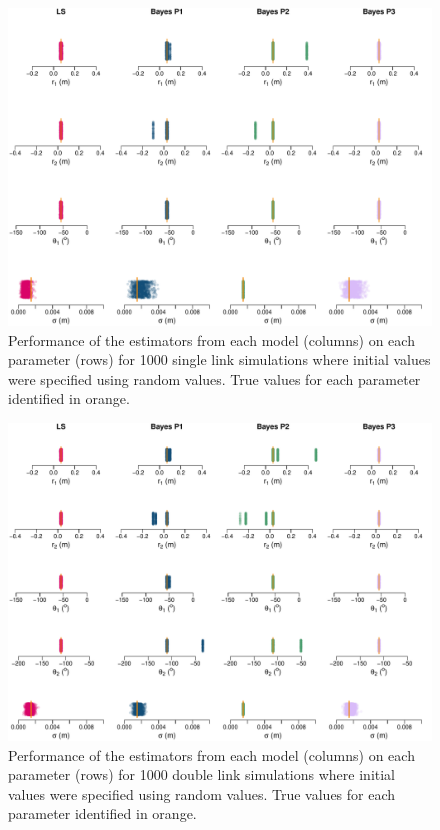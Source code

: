 \documentclass{article}
\begin{document}
\begin{figure}
\centering
\includegraphics[width=\textwidth]{./Figures/SingleLink_StripChart_random.pdf}
\caption{Performance of the estimators from each model (columns) on each parameter (rows) for 1000 single link simulations where initial values were specified using random values.  True values for each parameter identified in orange.}
\label{fig:StripChart_SingleLink_Random}
\end{figure}

\begin{figure}
\centering
\includegraphics[width=\textwidth]{./Figures/DoubleLink_StripChart_random.pdf}
\caption{Performance of the estimators from each model (columns) on each parameter (rows) for 1000 double link simulations where initial values were specified using random values.  True values for each parameter identified in orange.}
\label{fig:StripChart_DoubleLink_Random}
\end{figure}
\end{document}
